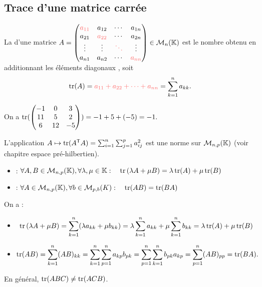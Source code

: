 \documentclass{book}
\begin{document}
\subsection{Trace d'une matrice carrée}
\begin{Definition}[Trace]
La   d'une matrice $A=\begin{pmatrix}
\mathbin{\color{colordef}a_{11}} & a_{12} & \cdots & a_{1n}\\
a_{21} & \mathbin{\color{colordef}a_{22}} & \cdots & a_{2n}\\
\vdots & \vdots & \mathbin{\color{colordef}\ddots} & \vdots\\
a_{n1} & a_{n2} & \cdots & \mathbin{\color{colordef}a_{nn}}\\
\end{pmatrix}\in \MnK$ est le nombre obtenu en additionnant les éléments diagonaux , soit
$$ \Tr(A) =\mathbin{\color{colordef}a_{11}+a_{22}+\dots+ a_{nn}}=\sum  _{k=1}^n a_{k k}. $$
\end{Definition}
\begin{Exemple}
On a $\operatorname{tr}(\begin{pmatrix}-1&0&3\\11&5&2\\6&12&-5\end{pmatrix})=-1+5+(-5)=-1.$
\end{Exemple}
\begin{Exemple}
L'application  $A\mapsto \operatorname{tr}(A^{\mathsf {T}} A)=\sum_{i=1}^n\sum_{j=1}^p a_{ij}^2$ est une norme sur $\mathcal{M}_{n,p}(\mathbb{K})$ (voir chapitre espace pré-hilbertien).
\end{Exemple}
\begin{Proposition}[Propriétés]
\begin{itemize}
\item {} :  $\forall A, B \in \mathcal{M}_{n,p}(\mathbb{K}),\forall \lambda,\mu\in \mathbb{K} :\quad  \operatorname{tr}\left(\lambda A+ \mu B\right)= \lambda\operatorname{tr}(A) + \mu\operatorname{tr}(B)$
\item  {} : $\forall A\in \mathcal{M}_{n,p}(\mathbb{K}),\forall b\in \mathcal{M}_{p,b}(K) :\quad  \operatorname{tr}(AB)= \operatorname{tr}(BA)$
\end{itemize}
\end{Proposition}
\begin{Demonstration} On a :
\begin{itemize}
\item $$\operatorname{tr}\left(\lambda A+ \mu B\right)=\sum  _{k=1}^n (\lambda a_{k k}+\mu b_{kk})=\lambda \sum  _{k=1}^n a_{k k}+\mu \sum  _{k=1}^n b_{kk}=\lambda \operatorname{tr} (A)+\mu \operatorname{tr}(B)$$
\item $$\operatorname{tr}( AB)=\sum_{k=1}^n (AB)_{kk}=\sum _{k=1}^n\sum_{p=1}^n  a_{kp}b_{pk}=\sum_{p=1}^n \sum _{k=1}^n b_{pk}  a_{kp}=\sum_{p=1}^n(AB)_{pp}=\operatorname{tr}(BA).  $$
\end{itemize}

\end{Demonstration}
\begin{Remarque}
En général, $\operatorname{tr}(ABC)\neq \operatorname{tr}(ACB)$.
\end{Remarque}
\end{document}
